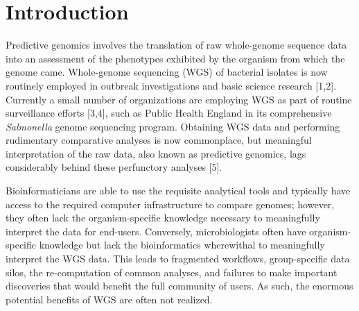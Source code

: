 \documentclass{bmcart}
\begin{document}


\section*{Introduction}
Predictive genomics involves the translation of raw whole-genome sequence data into an assessment of the phenotypes exhibited by the organism from which the genome came. Whole-genome sequencing (WGS) of bacterial isolates is now routinely employed in outbreak investigations and basic science research [1,2]. Currently a small number of organizations are employing WGS as part of routine surveillance efforts [3,4], such as Public Health England in its comprehensive \textit{Salmonella} genome sequencing program. Obtaining WGS data and performing rudimentary comparative analyses is now commonplace, but meaningful interpretation of the raw data, also known as predictive genomics, lags considerably behind these perfunctory analyses [5].

Bioinformaticians are able to use the requisite analytical tools and typically have access to the required computer infrastructure to compare genomes; however, they often lack the organism-specific knowledge necessary to meaningfully interpret the data for end-users. Conversely, microbiologists often have organism-specific knowledge but lack the bioinformatics wherewithal to meaningfully interpret the WGS data. This leads to fragmented workflows, group-specific data silos, the re-computation of common analyses, and failures to make important discoveries that would benefit the full community of users. As such, the enormous potential benefits of WGS are often not realized.
\end{document}
